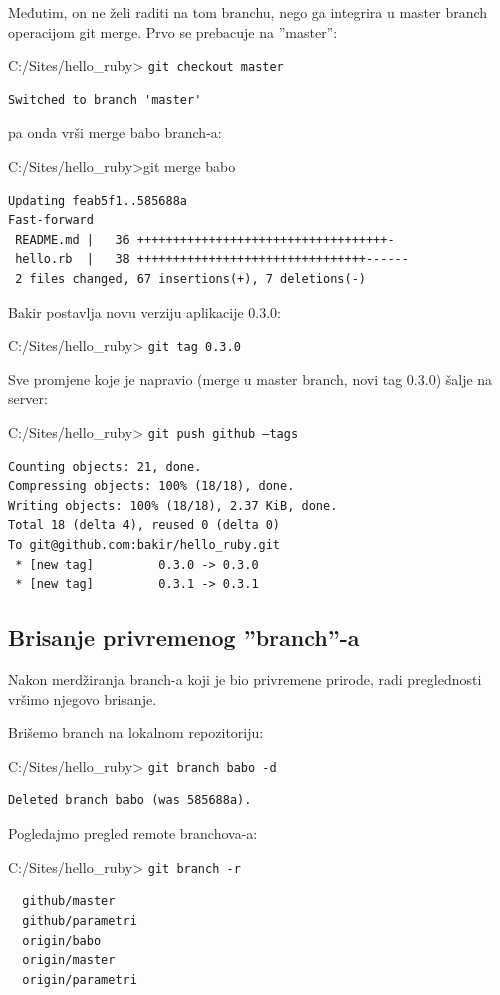 \documentclass[times, utf8, seminar]{fit}
\begin{document}
Međutim, on ne želi raditi na tom branchu, nego ga integrira u master branch operacijom git merge. Prvo se prebacuje na ''master'':

C:/Sites/hello\_ruby> \texttt{git checkout master}
\begin{lstlisting}
Switched to branch 'master'
\end{lstlisting}

pa onda vrši merge babo branch-a:

C:/Sites/hello\_ruby>git merge babo
\begin{lstlisting}
Updating feab5f1..585688a
Fast-forward
 README.md |   36 +++++++++++++++++++++++++++++++++++-
 hello.rb  |   38 ++++++++++++++++++++++++++++++++------
 2 files changed, 67 insertions(+), 7 deletions(-)
\end{lstlisting}

Bakir postavlja novu verziju aplikacije 0.3.0:

C:/Sites/hello\_ruby> \texttt{git tag 0.3.0}

Sve promjene koje je napravio (merge u master branch, novi tag 0.3.0) šalje na server:

C:/Sites/hello\_ruby> \texttt{git push github --tags}
\begin{lstlisting}
Counting objects: 21, done.
Compressing objects: 100% (18/18), done.
Writing objects: 100% (18/18), 2.37 KiB, done.
Total 18 (delta 4), reused 0 (delta 0)
To git@github.com:bakir/hello_ruby.git
 * [new tag]         0.3.0 -> 0.3.0
 * [new tag]         0.3.1 -> 0.3.1
\end{lstlisting}

\subsection{Brisanje privremenog ''branch''-a }

Nakon merdžiranja branch-a koji je bio privremene prirode, radi preglednosti vršimo njegovo brisanje.

Brišemo branch na lokalnom repozitoriju:

C:/Sites/hello\_ruby> \texttt{git branch babo -d}
\begin{lstlisting}
Deleted branch babo (was 585688a).
\end{lstlisting}

Pogledajmo pregled remote branchova-a:

C:/Sites/hello\_ruby> \texttt{git branch -r}
\begin{lstlisting}
  github/master
  github/parametri
  origin/babo
  origin/master
  origin/parametri
\end{lstlisting}
\end{document}
